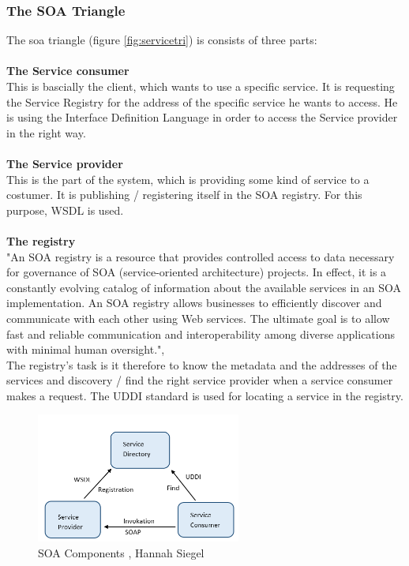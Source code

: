 \documentclass[12pt]{article}
\begin{document}
\subsubsection{The SOA Triangle}
\label{sec:soatriangle}
The \gls{soa} triangle (figure \ref{fig:servicetri}) is consists of three parts:
\\\\\textbf{The Service consumer} \\
This is bascially the client, which wants to use a specific service. It is requesting the Service Registry 	for the address of the specific service he wants to access. He is using the Interface Definition Language in order to  access the Service provider in the right way.
\\\\\textbf{The Service provider}\\ 
This is the part of the system, which is providing some kind of service to a costumer. It is publishing / registering itself in the SOA registry. For this purpose, WSDL is used.
\\\\\textbf{The registry}\\ 
"An SOA registry is a resource that provides controlled access to data necessary for governance of SOA (service-oriented architecture) projects. In effect, it is a constantly evolving catalog of information about the available services in an SOA implementation. An SOA registry allows businesses to efficiently discover and communicate with each other using Web services. The ultimate goal is to allow fast and reliable communication and interoperability among diverse applications with minimal human oversight.", \cite{soareg}\\
The registry's task is it therefore to know the metadata and the addresses of the services and discovery / find the right service provider when a service consumer makes a request.
The UDDI standard is used for locating a service in the registry.
\begin{figure}[here!]
\centering
	\includegraphics[width=0.6\textwidth]{images/tri_sm}
	  \caption{SOA Components \cite{arg3,arg1}, Hannah Siegel}
    \label{fig:servicetri}
        \label{fig:comtri}

	\end{figure}
\end{document}
